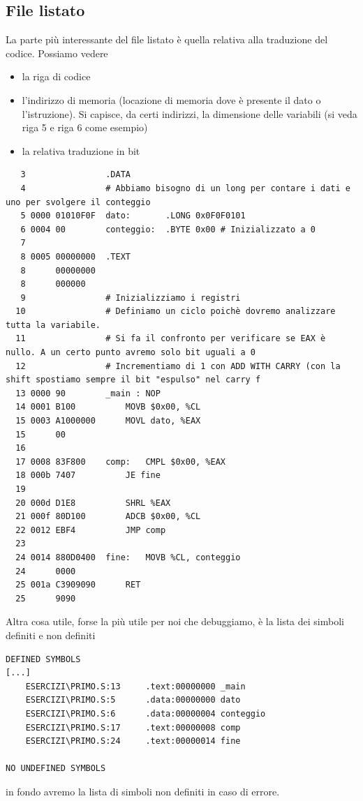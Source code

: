 \documentclass[11pt]{report}
\begin{document}
\subsection{File listato}
La parte più interessante del file listato è quella relativa alla traduzione del codice. Possiamo vedere
\begin{itemize}
\item la riga di codice
\item l'indirizzo di memoria (locazione di memoria dove è presente il dato o l'istruzione). Si capisce, da certi indirizzi, la dimensione delle variabili (si veda riga 5 e riga 6 come esempio)
\item la relativa traduzione in bit
\end{itemize}
\begin{verbatim}
   3              	.DATA
   4              	# Abbiamo bisogno di un long per contare i dati e uno per svolgere il conteggio
   5 0000 01010F0F 	dato: 		.LONG 0x0F0F0101
   6 0004 00       	conteggio: 	.BYTE 0x00 # Inizializzato a 0
   7              	
   8 0005 00000000 	.TEXT
   8      00000000 
   8      000000
   9              	# Inizializziamo i registri
  10              	# Definiamo un ciclo poichè dovremo analizzare tutta la variabile.
  11              	# Si fa il confronto per verificare se EAX è nullo. A un certo punto avremo solo bit uguali a 0
  12              	# Incrementiamo di 1 con ADD WITH CARRY (con la shift spostiamo sempre il bit "espulso" nel carry f
  13 0000 90       	_main : NOP
  14 0001 B100     		MOVB $0x00, %CL
  15 0003 A1000000 		MOVL dato, %EAX 
  15      00
  16              		
  17 0008 83F800   	comp: 	CMPL $0x00, %EAX 
  18 000b 7407     		JE fine
  19              	
  20 000d D1E8     		SHRL %EAX
  21 000f 80D100   		ADCB $0x00, %CL 
  22 0012 EBF4     		JMP comp
  23              	
  24 0014 880D0400 	fine:	MOVB %CL, conteggio
  24      0000
  25 001a C3909090 		RET
  25      9090
\end{verbatim}
Altra cosa utile, forse la più utile per noi che debuggiamo, è la lista dei simboli definiti e non definiti
\begin{verbatim}
DEFINED SYMBOLS
[...]
    ESERCIZI\PRIMO.S:13     .text:00000000 _main
    ESERCIZI\PRIMO.S:5      .data:00000000 dato
    ESERCIZI\PRIMO.S:6      .data:00000004 conteggio
    ESERCIZI\PRIMO.S:17     .text:00000008 comp
    ESERCIZI\PRIMO.S:24     .text:00000014 fine

NO UNDEFINED SYMBOLS
\end{verbatim}
in fondo avremo la lista di simboli non definiti in caso di errore.
\clearpage
\end{document}
